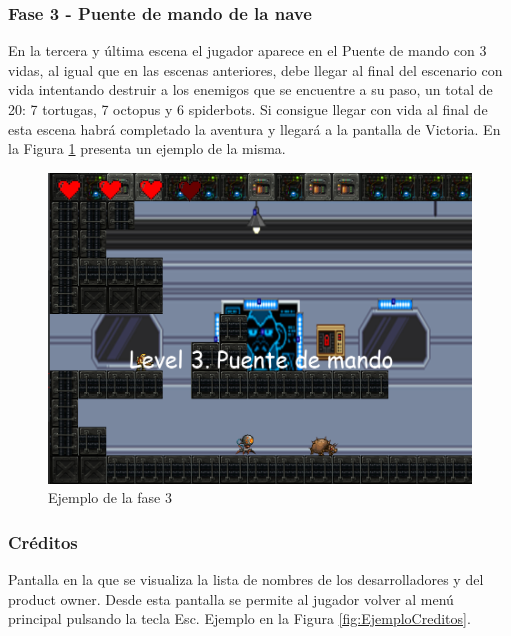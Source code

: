 \subsubsection{Fase 3 - Puente de mando de la nave}

En la tercera y última escena el jugador aparece en el Puente de mando con 3 vidas, al igual que en las escenas anteriores, debe llegar al final del escenario con vida intentando destruir a los enemigos que se encuentre a su paso, un total de 20: 7 tortugas, 7 octopus y 6 spiderbots. Si consigue llegar con vida al final de esta escena habrá completado la aventura y llegará a la pantalla de Victoria. En la Figura \ref{fig:EjemploEscena_3} presenta un ejemplo de la misma.

\begin{figure}[H]
    \centering
    \includegraphics[scale=0.50]{imagenes/EjemploEscena_3.png}
    \caption{\label{fig:EjemploEscena_3}Ejemplo de la fase 3}
\end{figure}

\subsubsection{Créditos}
Pantalla en la que se visualiza la lista de nombres de los desarrolladores y del product owner. Desde esta pantalla se permite al jugador volver al menú principal pulsando la tecla Esc. Ejemplo en la Figura \ref{fig:EjemploCreditos}.

